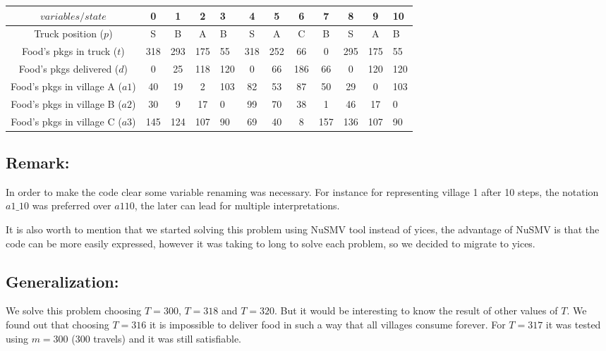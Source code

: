 \begin{description}
\begin{center}
\begin{tabular}{|c|c|c|c|a|c|c|c|c|c|c|a|}
  \hline
  $variables/state$ & 0 & 1 & 2 & 3 & 4 & 5 & 6 & 7 & 8 & 9 & 10  \\
  \hline
  Truck position ($p$) & S & B & A & B & S & A & C & B & S & A & B\\
  Food's pkgs in truck ($t$) & 318 & 293 & 175 & 55 & 318 & 252 & 66 & 0 & 295 & 175 & 55\\
  Food's pkgs delivered ($d$) & 0 & 25 & 118 & 120 & 0 & 66 & 186 & 66 & 0 & 120 & 120\\
  Food's pkgs in village A ($a1$) & 40  & 19  & 2   & 103 & 82 & 53 & 87 & 50  & 29  & 0   & 103 \\
  Food's pkgs in village B ($a2$) & 30  & 9   & 17  & 0   & 99 & 70 & 38 & 1   & 46  & 17  & 0  \\
  Food's pkgs in village C ($a3$) & 145 & 124 & 107 & 90  & 69 & 40 & 8  & 157 & 136 & 107 & 90  \\
  \hline
\end{tabular}
\end{center}

\end{description}


\subsection*{Remark:}
In order to make the code clear some variable renaming was necessary. For instance for representing village 1 after 10 steps, the notation $a1\_10$ was preferred over $a110$, the later can lead for multiple interpretations.
 
 It is also worth to mention that we started solving this problem using NuSMV tool instead of yices, the advantage of NuSMV is that the code can be more easily expressed, however it was taking to long to solve each problem, so we decided to migrate to yices.



\subsection*{Generalization:}

We solve this problem choosing $T = 300$, $T = 318$ and $T = 320$. But it would be interesting to know the result of other values of $T$. We found out that choosing $T=316$ it is impossible to deliver food in such a way that all villages consume forever. For $T=317$ it was tested using $m =300$ (300 travels) and it was still satisfiable.


